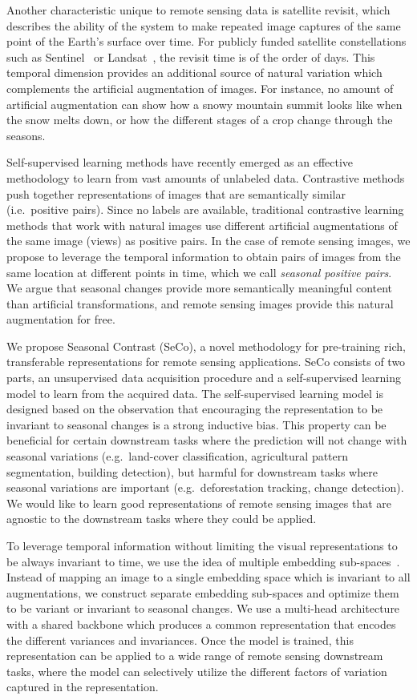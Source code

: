 \documentclass[10pt,twocolumn,letterpaper]{article}
\newcommand{\Methodname}[0]{Seasonal Contrast}
\newcommand{\methodname}[0]{SeCo}
\begin{document}
Another characteristic unique to remote sensing data is satellite revisit, which describes the ability of the system to make repeated image captures of the same point of the Earth's surface over time. For publicly funded satellite constellations such as Sentinel~\cite{drusch2012sentinel} or Landsat~\cite{roy2014landsat}, the revisit time is of the order of days. This temporal dimension provides an additional source of natural variation which complements the artificial augmentation of images. For instance, no amount of artificial augmentation can show how a snowy mountain summit looks like when the snow melts down, or how the different stages of a crop change through the seasons.

Self-supervised learning methods have recently emerged as an effective methodology to learn from vast amounts of unlabeled data. Contrastive methods push together representations of images that are semantically similar (i.e.\ positive pairs). Since no labels are available, traditional contrastive learning methods that work with natural images use different artificial augmentations of the same image (views) as positive pairs. In the case of remote sensing images, we propose to leverage the temporal information to obtain pairs of images from the same location at different points in time, which we call \textit{seasonal positive pairs}. We argue that seasonal changes provide more semantically meaningful content than artificial transformations, and remote sensing images provide this natural augmentation for free. 

We propose \Methodname{} (\methodname{}), a novel methodology for pre-training rich, transferable representations for remote sensing applications. \methodname{} consists of two parts, an unsupervised data acquisition procedure and a self-supervised learning model to learn from the acquired data. The self-supervised learning model is designed based on the observation that encouraging the representation to be invariant to seasonal changes is a strong inductive bias. This property can be beneficial for certain downstream tasks where the prediction will not change with seasonal variations (e.g.\ land-cover classification, agricultural pattern segmentation, building detection), but harmful for downstream tasks where seasonal variations are important (e.g.\ deforestation tracking, change detection). We would like to learn good representations of remote sensing images that are agnostic to the downstream tasks where they could be applied.

To leverage temporal information without limiting the visual representations to be always invariant to time, we use the idea of multiple embedding sub-spaces~\cite{xiao2020should}. Instead of mapping an image to a single embedding space which is invariant to all augmentations, we construct separate embedding sub-spaces and optimize them to be variant or invariant to seasonal changes. We use a multi-head architecture with a shared backbone which produces a common representation that encodes the different variances and invariances. Once the model is trained, this representation can be applied to a wide range of remote sensing downstream tasks, where the model can selectively utilize the different factors of variation captured in the representation.
\end{document}
